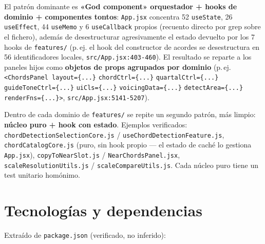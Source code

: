 \documentclass[a4paper,11pt,oneside]{report}
\begin{document}
El patrón dominante es \textbf{«God component» orquestador + hooks de dominio + componentes tontos}: \lstinline!App.jsx! concentra 52 \lstinline!useState!, 26 \lstinline!useEffect!, 44 \lstinline!useMemo! y 6 \lstinline!useCallback! propios (recuento directo por grep sobre el fichero), además de desestructurar agresivamente el estado devuelto por los 7 hooks de \lstinline!features/! (p.\,ej. el hook del constructor de acordes se desestructura en 56 identificadores locales, \lstinline!src/App.jsx:403-460!). El resultado se reparte a los paneles hijos como \textbf{objetos de props agrupados por dominio} (p.\,ej. \lstinline!<ChordsPanel layout={...}! \lstinline!chordCtrl={...}! \lstinline!quartalCtrl={...}! \lstinline!guideToneCtrl={...}! \lstinline!uiCls={...}! \lstinline!voicingData={...}! \lstinline!detectArea={...}! \lstinline!renderFns={...}>!, \lstinline!src/App.jsx:5141-5207!).

Dentro de cada dominio de \lstinline!features/! se repite un segundo patrón, más limpio: \textbf{núcleo puro + hook con estado}. Ejemplos verificados: \lstinline!chordDetectionSelectionCore.js! / \lstinline!useChordDetectionFeature.js!, \lstinline!chordCatalogCore.js! (puro, sin hook propio --- el estado de caché lo gestiona \lstinline!App.jsx!), \lstinline!copyToNearSlot.js! / \lstinline!NearChordsPanel.jsx!, \lstinline!scaleResolutionUtils.js! / \lstinline!scaleCompareUtils.js!. Cada núcleo puro tiene un test unitario homónimo.

\chapter{Tecnologías y dependencias}
\label{sec:3}

Extraído de \lstinline!package.json! (verificado, no inferido):
\end{document}

